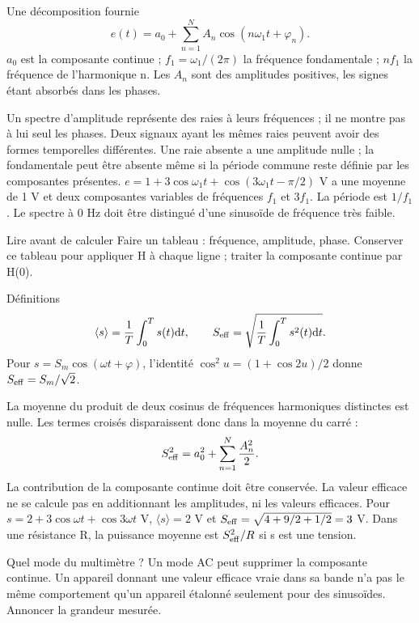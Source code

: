 \begin{loi}{Une décomposition fournie}
\[e(t)=a_0+\sum_{n=1}^{N}A_n\cos(n\omega_1t+\varphi_n).\]$a_0$ est la composante continue ; $f_1=\omega_1/(2\pi)$ la fréquence fondamentale ; $nf_1$ la fréquence de l’harmonique n. Les $A_n$ sont des amplitudes positives, les signes étant absorbés dans les phases.
\end{loi}
Un spectre d’amplitude représente des raies à leurs fréquences ; il ne montre pas à lui seul les phases. Deux signaux ayant les mêmes raies peuvent avoir des formes temporelles différentes. Une raie absente a une amplitude nulle ; la fondamentale peut être absente même si la période commune reste définie par les composantes présentes.
$e=1+3\cos\omega_1t+\cos(3\omega_1t-\pi/2)$ V a une moyenne de 1 V et deux composantes variables de fréquences $f_1$ et $3f_1$. La période est $1/f_1$. Le spectre à 0 Hz doit être distingué d’une sinusoïde de fréquence très faible.
\begin{methode}{Lire avant de calculer}
Faire un tableau : fréquence, amplitude, phase. Conserver ce tableau pour appliquer H à chaque ligne ; traiter la composante continue par H(0).
\end{methode}


\begin{loi}{Définitions}
\[\langle s\rangle=\frac1T\int_0^T s(t)\mathrm{d} t,\qquad S_{\rm eff}=\sqrt{\frac1T\int_0^T s^2(t)\mathrm{d} t}.\]Pour $s=S_m\cos(\omega t+\varphi)$, l’identité $\cos^2u=(1+\cos2u)/2$ donne $S_{\rm eff}=S_m/\sqrt2$.
\end{loi}
La moyenne du produit de deux cosinus de fréquences harmoniques distinctes est nulle. Les termes croisés disparaissent donc dans la moyenne du carré :\[S_{\rm eff}^2=a_0^2+\sum_{n=1}^N\frac{A_n^2}{2}.\]La contribution de la composante continue doit être conservée. La valeur efficace ne se calcule pas en additionnant les amplitudes, ni les valeurs efficaces.
Pour $s=2+3\cos\omega t+\cos3\omega t$ V, $\langle s\rangle=2$ V et $S_{\rm eff}=\sqrt{4+9/2+1/2}=3$ V. Dans une résistance R, la puissance moyenne est $S_{\rm eff}^2/R$ si s est une tension.
\begin{piege}{Quel mode du multimètre ?}
Un mode AC peut supprimer la composante continue. Un appareil donnant une valeur efficace vraie dans sa bande n’a pas le même comportement qu’un appareil étalonné seulement pour des sinusoïdes. Annoncer la grandeur mesurée.
\end{piege}


